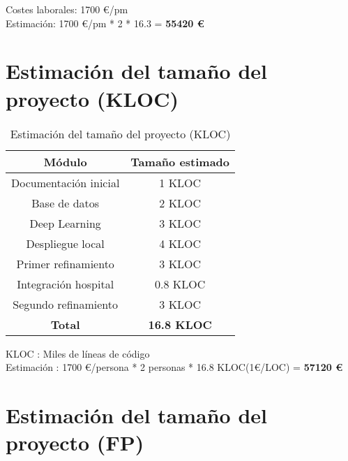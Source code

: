 Costes laborales: 1700 \euro/pm \\
Estimación: 1700 \euro/pm * 2 * 16.3 = \textbf{55420 \euro}

\section{Estimación del tamaño del proyecto (KLOC)}

\begin{table}[H]
	\begin{center}
		\begin{tabular}{|c||c|}
			\hline 
			Módulo & Tamaño estimado \\
			\hline \hline
			Documentación inicial & 1 KLOC \\ \hline
			Base de datos & 2 KLOC \\ \hline
			Deep Learning & 3 KLOC \\ \hline
			Despliegue local & 4 KLOC \\ \hline
			Primer refinamiento & 3 KLOC \\ \hline
			Integración hospital & 0.8 KLOC \\ \hline
			Segundo refinamiento & 3 KLOC \\ \hline
			\textbf{Total} & \textbf{16.8 KLOC} \\ \hline
		\end{tabular}
		\caption{Estimación del tamaño del proyecto (KLOC)}
		\label{tabla:tamaño}
	\end{center}
\end{table}

KLOC : Miles de líneas de código \\
Estimación : 1700 \euro/persona * 2 personas * 16.8 KLOC(1\euro/LOC) = \textbf{57120 \euro}

\section{Estimación del tamaño del proyecto (FP)}

